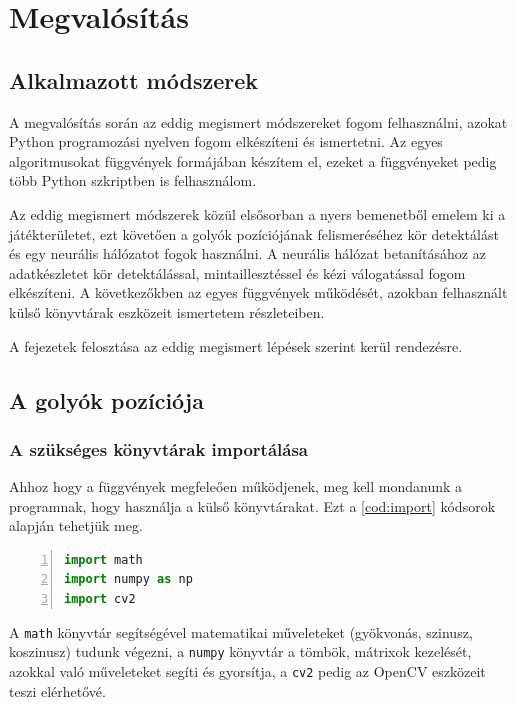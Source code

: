 \renewcommand{\lstlistingname}{kódrészlet}

\chapter{Megvalósítás}
\section{Alkalmazott módszerek}
A megvalósítás során az eddig megismert módszereket fogom felhasználni, azokat Python programozási nyelven fogom elkészíteni és ismertetni. Az egyes algoritmusokat függvények formájában készítem el, ezeket a függvényeket pedig több Python szkriptben is felhasználom.
\par Az eddig megismert módszerek közül elsősorban a nyers bemenetből emelem ki a játékterületet, ezt követően a golyók pozíciójának felismeréséhez kör detektálást és egy neurális hálózatot fogok használni. A neurális hálózat betanításához az adatkészletet kör detektálással, mintaillesztéssel és kézi válogatással fogom elkészíteni. A következőkben az egyes függvények működését, azokban felhasznált külső könyvtárak eszközeit ismertetem részleteiben.
\par A fejezetek felosztása az eddig megismert lépések szerint kerül rendezésre.

\section{A golyók pozíciója}

\subsection{A szükséges könyvtárak importálása}
Ahhoz hogy a függvények megfeleően működjenek, meg kell mondanunk a programnak, hogy használja a külső könyvtárakat.
\newline Ezt a \ref{cod:import} kódsorok alapján tehetjük meg.

\vspace{2mm}
\hspace{-10mm}
\begin{minipage}{\linewidth}
\begin{lstlisting}[language=Python, numbers=left, caption={Könyvtárak importálása.}, label={cod:import}]
import math
import numpy as np
import cv2
\end{lstlisting}
\end{minipage}

\par A \lstinline{math} könyvtár segítségével matematikai műveleteket (gyökvonás, szinusz, koszinusz) tudunk végezni, a \lstinline{numpy} könyvtár a tömbök, mátrixok kezelését, azokkal való műveleteket segíti és gyorsítja, a \lstinline{cv2} pedig az OpenCV eszközeit teszi elérhetővé.


